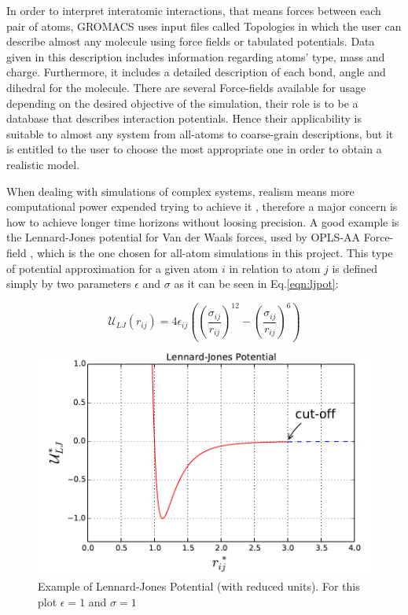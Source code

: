 \documentclass[10pt,a4paper,twoside]{article}
\begin{document}
 In order to interpret interatomic interactions, that means forces between each pair of atoms, GROMACS uses input files called Topologies in which the user can describe almost any molecule using force fields or tabulated potentials. Data given in this description includes information regarding atoms' type, mass and charge. Furthermore, it includes a detailed description of each bond, angle and dihedral for the molecule. There are several Force-fields available for usage depending on the desired objective of the simulation, their role is to be a database that describes interaction potentials. Hence their applicability is suitable to almost any system from all-atoms to coarse-grain descriptions, but it is entitled to the user to choose the most appropriate one in order to obtain a realistic model.
 
  When dealing with simulations of complex systems, realism means more computational power expended trying to achieve it \cite{satoh}, therefore a major concern is how to achieve longer time horizons without loosing precision. A good example is the Lennard-Jones potential for Van der Waals forces, used by OPLS-AA Force-field \cite{opls}, which is the one chosen for all-atom simulations in this project. This type of potential approximation for a given atom $i$ in relation to atom $j$ is defined simply by two parameters  $\epsilon$ and $\sigma$ as it can be seen in Eq.\ref{eqn:ljpot}:

\begin{equation}
\mathcal{U}_{LJ}(r_{ij}) = 4\epsilon_{ij}\left(\left( \dfrac{\sigma_{ij}}{r_{ij}}\right)^{12} - \left( \dfrac{\sigma_{ij}}{r_{ij}}\right)^6\right) 
\label{eqn:ljpot}
\end{equation}

 \begin{figure}[ht]
  \begin{center}
	\includegraphics[width=0.6 \textwidth]{./graphs/lj}
	\caption{Example of Lennard-Jones Potential (with reduced units). For this plot $\epsilon = 1$ and $\sigma = 1$ }
	\label{gfx:ljg}
	\end{center}
	\end{figure}
\end{document}
